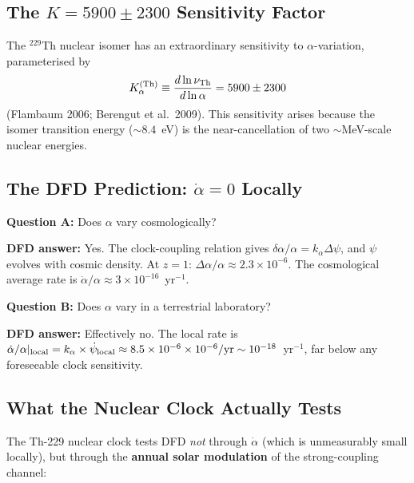 \documentclass[11pt]{article}
\newcommand{\kalpha}{k_\alpha}
\theoremstyle{definition}
\theoremstyle{remark}
\begin{document}
\subsection{The $K = 5900 \pm 2300$ Sensitivity Factor}

The $^{229}$Th nuclear isomer has an extraordinary sensitivity to
$\alpha$-variation, parameterised by
\begin{equation}
K_\alpha^{(\rm Th)} \equiv \frac{d\ln\nu_{\rm Th}}{d\ln\alpha}
= 5900 \pm 2300
\end{equation}
(Flambaum 2006; Berengut et al.\ 2009). This sensitivity arises because
the isomer transition energy ($\sim 8.4$~eV) is the near-cancellation
of two $\sim$MeV-scale nuclear energies.

\subsection{The DFD Prediction: $\dot\alpha = 0$ Locally}

\begin{tcolorbox}[colback=red!5!white, colframe=red!60!black,
  title={Critical Distinction: Two Different Questions}]
\textbf{Question A:} Does $\alpha$ vary cosmologically?

\textbf{DFD answer:} Yes. The clock-coupling relation gives
$\delta\alpha/\alpha = \kalpha \Delta\psi$, and $\psi$ evolves with
cosmic density. At $z = 1$: $\Delta\alpha/\alpha \approx 2.3 \times 10^{-6}$.
The cosmological average rate is
$\dot\alpha/\alpha \approx 3 \times 10^{-16}$~yr$^{-1}$.

\textbf{Question B:} Does $\alpha$ vary in a terrestrial laboratory?

\textbf{DFD answer:} Effectively no. The local rate is
$\dot\alpha/\alpha|_{\rm local} = \kalpha \times \dot\psi_{\rm local}
\approx 8.5 \times 10^{-6} \times 10^{-6}/\text{yr}
\sim 10^{-18}$~yr$^{-1}$,
far below any foreseeable clock sensitivity.
\end{tcolorbox}

\subsection{What the Nuclear Clock Actually Tests}

The Th-229 nuclear clock tests DFD \emph{not} through $\dot\alpha$
(which is unmeasurably small locally), but through the
\textbf{annual solar modulation} of the strong-coupling channel:
\end{document}
